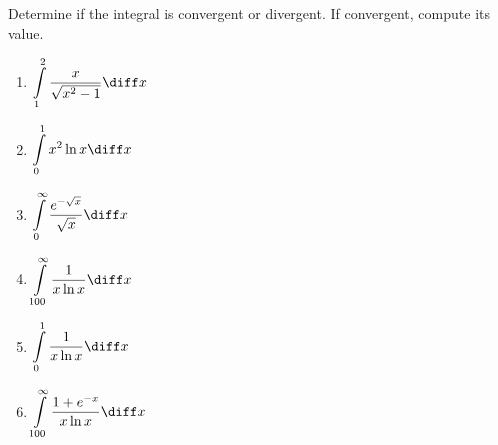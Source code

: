 Determine if the integral is convergent or divergent. If convergent, compute its value.
\begin{multicols}{2}
\begin{enumerate}[ref={\fcProblemRef}]
\item $\displaystyle \int\limits_{1}^{2} \frac{x}{\sqrt{x^2-1}}\diff x$ 

\item $\displaystyle \int\limits_{0}^{1} x^2\ln x\diff x$ \label{problemImproperIntegral x^2ln x dx}

\item \label{problemImproperIntegral e^(-sqrt x)/sqrt(x)dx}
$\displaystyle \int\limits_{0}^{\infty} \frac{e^{-\sqrt{x}}}{ \sqrt{x}} \diff x $

\item \label{problemImproperIntegral1/(x ln x)dx} $\displaystyle \int\limits_{100}^{\infty} \frac{1}{x\ln x}\diff x $

\item $\displaystyle \int\limits_{0}^{1} \frac{1}{x\ln x}\diff x $

\item \label{problemImproperIntegral(1+e^(-x))/(xlnx)dx}
$\displaystyle \int\limits_{100}^{\infty} \frac{1+e^{-x}}{x\ln x }\diff x $ 
\end{enumerate}
\end{multicols}